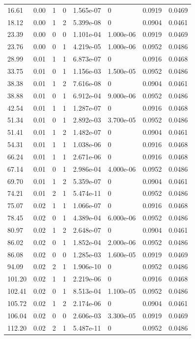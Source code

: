 \documentclass[preview]{standalone}
\begin{document}
{{\begin{tabular}{L{1.2cm}C{1.2cm} C{0.3cm}C{0.5cm} C{1.4cm}C{1.4cm} C{1.4cm}C{1.4cm}}
  16.61  &  0.00  & 1     &  0 &  1.565e-07  & 0  & 0.0919 &  0.0469   \\ 
  18.12  &  0.00  & 1     &  2 &  5.399e-08  & 0  & 0.0904 &  0.0461   \\ 
  23.39  &  0.00  & 0     &  0 &  1.101e-04  & 1.000e-06  & 0.0919 &  0.0469   \\ 
  23.76  &  0.00  & 0     &  1 &  4.219e-05  & 1.000e-06  & 0.0952 &  0.0486   \\ 
  28.99  &  0.01  & 1     &  1 &  6.873e-07  & 0  & 0.0916 &  0.0468   \\ 
  33.75  &  0.01  & 0     &  1 &  1.156e-03  & 1.500e-05  & 0.0952 &  0.0486   \\ 
  38.38  &  0.01  & 1     &  2 &  7.616e-08  & 0  & 0.0904 &  0.0461   \\ 
  38.88  &  0.01  & 0     &  1 &  6.912e-04  & 9.000e-06  & 0.0952 &  0.0486   \\ 
  42.54  &  0.01  & 1     &  1 &  1.287e-07  & 0  & 0.0916 &  0.0468   \\ 
  51.34  &  0.01  & 0     &  1 &  2.892e-03  & 3.700e-05  & 0.0952 &  0.0486   \\ 
  51.41  &  0.01  & 1     &  2 &  1.482e-07  & 0  & 0.0904 &  0.0461   \\ 
  54.31  &  0.01  & 1     &  1 &  1.038e-06  & 0  & 0.0916 &  0.0468   \\ 
  66.24  &  0.01  & 1     &  1 &  2.671e-06  & 0  & 0.0916 &  0.0468   \\ 
  67.14  &  0.01  & 0     &  1 &  2.986e-04  & 4.000e-06  & 0.0952 &  0.0486   \\ 
  69.70  &  0.01  & 1     &  2 &  5.359e-07  & 0  & 0.0904 &  0.0461   \\ 
  74.21  &  0.01  & 2     &  1 &  5.474e-11  & 0  & 0.0952 &  0.0486   \\ 
  75.07  &  0.02  & 1     &  1 &  1.066e-07  & 0  & 0.0916 &  0.0468   \\ 
  78.45  &  0.02  & 0     &  1 &  4.389e-04  & 6.000e-06  & 0.0952 &  0.0486   \\ 
  80.97  &  0.02  & 1     &  2 &  2.648e-07  & 0  & 0.0904 &  0.0461   \\ 
  86.02  &  0.02  & 0     &  1 &  1.852e-04  & 2.000e-06  & 0.0952 &  0.0486   \\ 
  86.08  &  0.02  & 0     &  0 &  1.285e-03  & 1.600e-05  & 0.0919 &  0.0469   \\ 
  94.09  &  0.02  & 2     &  1 &  1.906e-10  & 0  & 0.0952 &  0.0486   \\ 
  101.20  &  0.02  & 1     &  1 &  2.219e-06  & 0  & 0.0916 &  0.0468   \\ 
  102.41  &  0.02  & 0     &  1 &  8.513e-04  & 1.100e-05  & 0.0952 &  0.0486   \\ 
  105.72  &  0.02  & 1     &  2 &  2.174e-06  & 0  & 0.0904 &  0.0461   \\ 
  106.04  &  0.02  & 0     &  0 &  2.606e-03  & 3.300e-05  & 0.0919 &  0.0469   \\ 
  112.20  &  0.02  & 2     &  1 &  5.487e-11  & 0  & 0.0952 &  0.0486   \\ 
\hline 
\end{tabular} 

}}
\end{document}
